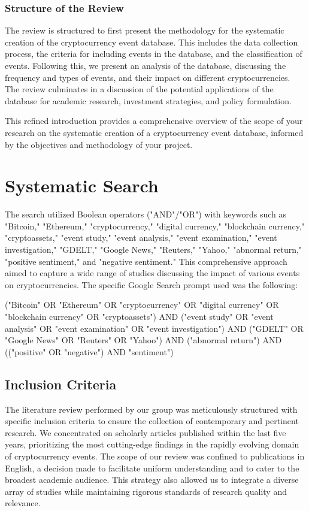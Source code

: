 \documentclass{article}
\begin{document}
\subsubsection{Structure of the Review}

The review is structured to first present the methodology for the systematic creation of the cryptocurrency event database. This includes the data collection process, the criteria for including events in the database, and the classification of events. Following this, we present an analysis of the database, discussing the frequency and types of events, and their impact on different cryptocurrencies. The review culminates in a discussion of the potential applications of the database for academic research, investment strategies, and policy formulation.

This refined introduction provides a comprehensive overview of the scope of your research on the systematic creation of a cryptocurrency event database, informed by the objectives and methodology of your project.


\section{Systematic Search}

The search utilized Boolean operators ("AND"/"OR") with keywords such as "Bitcoin," "Ethereum," "cryptocurrency," "digital currency," "blockchain currency," "cryptoassets," "event study," "event analysis," "event examination," "event investigation," "GDELT," "Google News," "Reuters," "Yahoo," "abnormal return," "positive sentiment," and "negative sentiment." This comprehensive approach aimed to capture a wide range of studies discussing the impact of various events on cryptocurrencies. The specific Google Search prompt used was the following:

("Bitcoin" OR "Ethereum" OR "cryptocurrency" OR "digital currency" OR "blockchain currency" OR "cryptoassets") AND ("event study" OR "event analysis" OR "event examination" OR "event investigation") AND ("GDELT" OR "Google News" OR "Reuters" OR "Yahoo") AND ("abnormal return") AND (("positive" OR  "negative") AND "sentiment")


\subsection{Inclusion Criteria}

The literature review performed by our group was meticulously structured with specific inclusion criteria to ensure the collection of contemporary and pertinent research. We concentrated on scholarly articles published within the last five years, prioritizing the most cutting-edge findings in the rapidly evolving domain of cryptocurrency events. The scope of our review was confined to publications in English, a decision made to facilitate uniform understanding and to cater to the broadest academic audience. This strategy also allowed us to integrate a diverse array of studies while maintaining rigorous standards of research quality and relevance.
\end{document}
